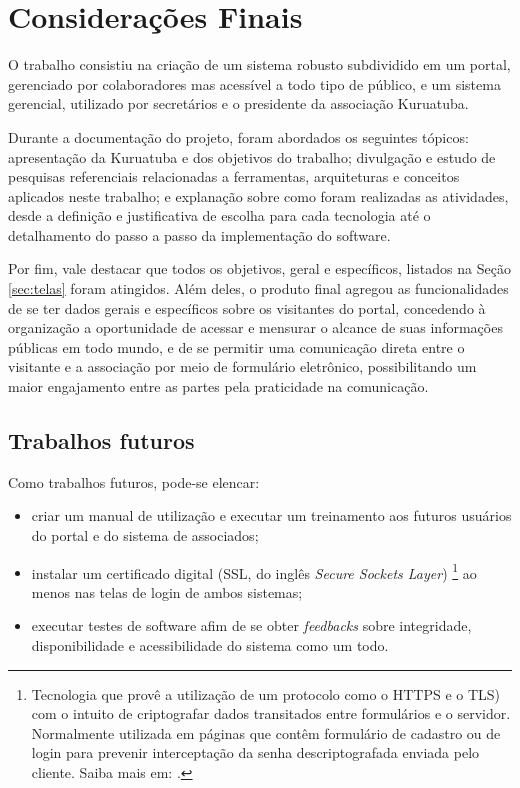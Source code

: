 \chapter{Considerações Finais}

O trabalho consistiu na criação de um sistema robusto subdividido em um portal, gerenciado por colaboradores mas acessível a todo tipo de público, e um sistema gerencial, utilizado por secretários e o presidente da associação Kuruatuba. 

Durante a documentação do projeto, foram abordados os seguintes tópicos: apresentação da Kuruatuba e dos objetivos do trabalho; divulgação e estudo de pesquisas referenciais relacionadas a ferramentas, arquiteturas e conceitos aplicados neste trabalho; e explanação sobre como foram realizadas as atividades, desde a definição e justificativa de escolha para cada tecnologia até o detalhamento do passo a passo da implementação do software.

Por fim, vale destacar que todos os objetivos, geral e específicos, listados na Seção \ref{sec:telas} foram atingidos. Além deles, o produto final agregou as funcionalidades de se ter dados gerais e específicos sobre os visitantes do portal, concedendo à organização a oportunidade de acessar e mensurar o alcance de suas informações públicas em todo mundo, e de se permitir uma comunicação direta entre o visitante e a associação por meio de formulário eletrônico, possibilitando um maior engajamento entre as partes pela praticidade na comunicação. 


\hspace{2.5cm}
\section{Trabalhos futuros}
\hspace{2.5cm}

Como trabalhos futuros, pode-se elencar:

\begin{itemize}
 \item criar um manual de utilização e executar um treinamento aos futuros usuários do portal e do sistema de associados;
 \item instalar um certificado digital (SSL, do inglês \textit{Secure Sockets Layer}) \footnote{Tecnologia que provê a utilização de um protocolo como o HTTPS e o TLS) com o intuito de criptografar dados transitados entre formulários e o servidor. Normalmente utilizada em páginas que contêm formulário de cadastro ou de login para prevenir interceptação da senha descriptografada enviada pelo cliente. Saiba mais em: .} ao menos nas telas de login de ambos sistemas;
 \item executar testes de software afim de se obter \textit{feedbacks} sobre integridade, disponibilidade e acessibilidade do sistema como um todo.
\end{itemize}


